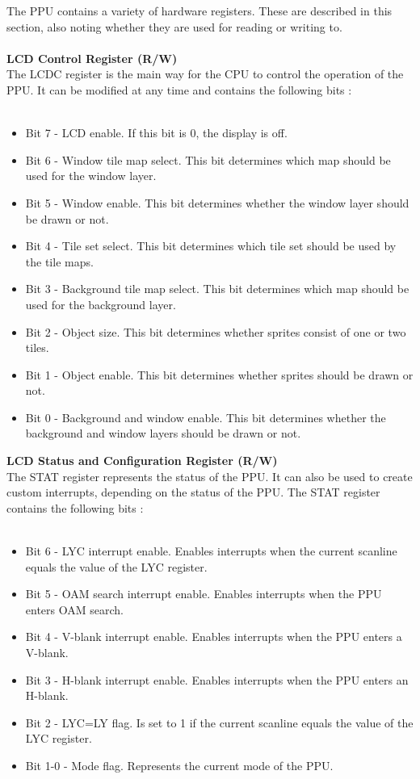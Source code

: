 The PPU contains a variety of hardware registers. These are described in this section, also noting whether they are used for reading or writing to. \\
\\
\textbf{LCD Control Register (R/W)}\\
The LCDC register is the main way for the CPU to control the operation of the PPU. It can be modified at any time and contains the following bits \cite{pandocsLCDC}:\\
\\
\begin{itemize}
    \item Bit 7 - LCD enable. If this bit is 0, the display is off.
    \item Bit 6 - Window tile map select. This bit determines which map should be used for the window layer.
    \item Bit 5 - Window enable. This bit determines whether the window layer should be drawn or not.
    \item Bit 4 - Tile set select. This bit determines which tile set should be used by the tile maps.
    \item Bit 3 - Background tile map select. This bit determines which map should be used for the background layer.
    \item Bit 2 - Object size. This bit determines whether sprites consist of one or two tiles.
    \item Bit 1 - Object enable. This bit determines whether sprites should be drawn or not.
    \item Bit 0 - Background and window enable. This bit determines whether the background and window layers should be drawn or not.
\end{itemize}

\vspace{30pt}
\newpage
\textbf{LCD Status and Configuration Register (R/W)}\\
The STAT register represents the status of the PPU. It can also be used to create custom interrupts, depending on the status of the PPU. The STAT register contains the following bits \cite{pandocsSTAT}:\\
\\
\begin{itemize}
    \item Bit 6 - LYC interrupt enable. Enables interrupts when the current scanline equals the value of the LYC register.
    \item Bit 5 - OAM search interrupt enable. Enables interrupts when the PPU enters OAM search.
     \item Bit 4 - V-blank interrupt enable. Enables interrupts when the PPU enters a V-blank.
    \item Bit 3 - H-blank interrupt enable. Enables interrupts when the PPU enters an H-blank.
    \item Bit 2 - LYC=LY flag. Is set to 1 if the current scanline equals the value of the LYC register.
    \item Bit 1-0 - Mode flag. Represents the current mode of the PPU.
\end{itemize}

